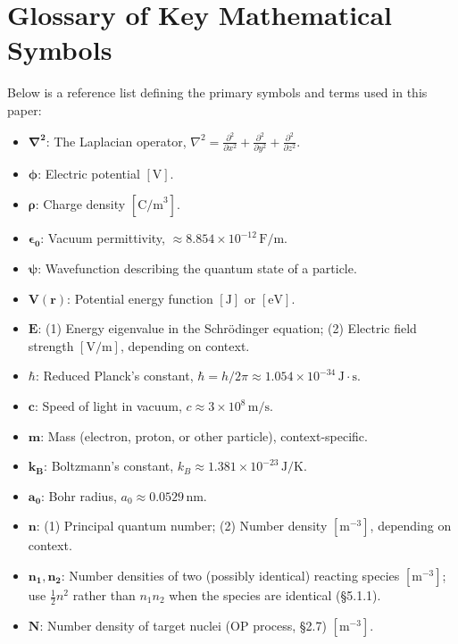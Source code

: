 \documentclass[11pt,a4paper]{article}
\begin{document}
\section{Glossary of Key Mathematical Symbols}

Below is a reference list defining the primary symbols and terms used in this paper:

\begin{itemize}
\item
  $\boldsymbol{\nabla^2}$: The Laplacian operator, $\nabla^2 = \frac{\partial^2}{\partial x^2} + \frac{\partial^2}{\partial y^2} + \frac{\partial^2}{\partial z^2}$.
\item
  $\boldsymbol{\phi}$: Electric potential $[\text{V}]$.
\item
  $\boldsymbol{\rho}$: Charge density $[\text{C/m}^3]$.
\item
  $\boldsymbol{\epsilon_0}$: Vacuum permittivity, $\approx 8.854 \times 10^{-12}\,\text{F/m}$.
\item
  $\boldsymbol{\psi}$: Wavefunction describing the quantum state of a particle.
\item
  $\boldsymbol{V(\mathbf{r})}$: Potential energy function $[\text{J}]$ or $[\text{eV}]$.
\item
  $\boldsymbol{E}$: (1) Energy eigenvalue in the Schr\"{o}dinger equation; (2) Electric field strength $[\text{V/m}]$, depending on context.
\item
  $\boldsymbol{\hbar}$: Reduced Planck's constant, $\hbar = h/2\pi \approx 1.054 \times 10^{-34}\,\text{J}\cdot\text{s}$.
\item
  $\boldsymbol{c}$: Speed of light in vacuum, $c \approx 3 \times 10^8\,\text{m/s}$.
\item
  $\boldsymbol{m}$: Mass (electron, proton, or other particle), context-specific.
\item
  $\boldsymbol{k_B}$: Boltzmann's constant, $k_B \approx 1.381 \times 10^{-23}\,\text{J/K}$.
\item
  $\boldsymbol{a_0}$: Bohr radius, $a_0 \approx 0.0529\,\text{nm}$.
\item
  $\boldsymbol{n}$: (1) Principal quantum number; (2) Number density $[\text{m}^{-3}]$, depending on context.
\item
  $\boldsymbol{n_1, n_2}$: Number densities of two (possibly identical) reacting species $[\text{m}^{-3}]$; use $\tfrac{1}{2}n^2$ rather than $n_1 n_2$ when the species are identical (\S{}5.1.1).
\item
  $\boldsymbol{N}$: Number density of target nuclei (OP process, \S{}2.7) $[\text{m}^{-3}]$.

\end{itemize}
\end{document}
